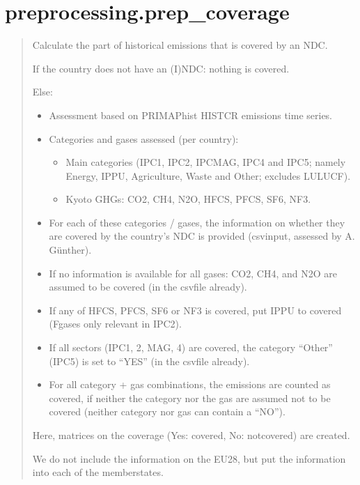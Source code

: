 \documentclass[letterpaper,10pt,english]{sphinxmanual}
\begin{document}
\chapter{preprocessing.prep\_coverage}
\label{\detokenize{code:preprocessing-prep-coverage}}
\begin{quote}

Calculate the part of historical emissions that is covered by an NDC.

If the country does not have an (I)NDC: nothing is covered.

Else:
\begin{itemize}
\item {} 
Assessment based on PRIMAP\sphinxhyphen{}hist HISTCR emissions time series.

\item {} 
Categories and gases assessed (per country):
\begin{itemize}
\item {} 
Main categories (IPC1, IPC2, IPCMAG, IPC4 and IPC5; namely Energy, IPPU, Agriculture, Waste and Other; excludes LULUCF).

\item {} 
Kyoto GHGs: CO2, CH4, N2O, HFCS, PFCS, SF6, NF3.

\end{itemize}

\item {} 
For each of these categories / gases, the information on whether they are covered by the country’s NDC is provided (csv\sphinxhyphen{}input, assessed by A. Günther).

\item {} 
If no information is available for all gases: CO2, CH4, and N2O are assumed to be covered (in the csv\sphinxhyphen{}file already).

\item {} 
If any of HFCS, PFCS, SF6 or NF3 is covered, put IPPU to covered (F\sphinxhyphen{}gases only relevant in IPC2).

\item {} 
If all sectors (IPC1, 2, MAG, 4) are covered, the category “Other” (IPC5) is set to “YES” (in the csv\sphinxhyphen{}file already).

\item {} 
For all category + gas combinations, the emissions are counted as covered, if neither the category nor the gas are assumed not to be covered (neither category nor gas can contain a “NO”).

\end{itemize}

Here, matrices on the coverage (Yes: covered, No: not\sphinxhyphen{}covered) are created.

We do not include the information on the EU28, but put the information into each of the member\sphinxhyphen{}states.
\end{quote}
\end{document}
